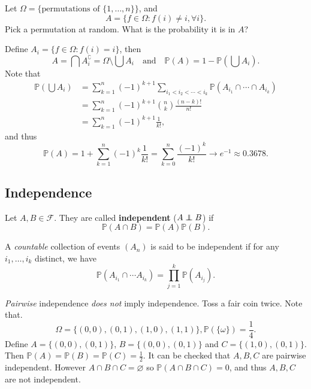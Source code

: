 \begin{example}
    Let $ \Omega=\{\text{permutations of }\{1,\dots,n\}\} $, and
    \[
        A = \{f\in\Omega: f(i)\neq i, \forall i\}.
    \]
    Pick a permutation at random. What is the probability it is in $A$?

    Define $ A_i = \{f\in \Omega: f(i)=i\} $, then 
    \[
        A=\bigcap A_i^{\complement} = \Omega\setminus \bigcup A_i \quad \text{and}\quad \mathbb{P}(A)=1-\mathbb{P}\left( \bigcup A_i \right).
    \]
    Note that 
    \begin{align*}
        \mathbb{P}\left( \bigcup A_i \right)&= \sum_{k=1}^{n}(-1)^{k+1} \sum_{i_1<i_2<\cdots<i_k}\mathbb{P}\left( A_{i_1}\cap \cdots \cap A_{i_k} \right)\\ 
        &= \sum_{k=1}^{n}(-1)^{k+1}\binom{n}{k}\frac{(n-k)!}{n!}\\ 
        &= \sum_{k=1}^{n}(-1)^{k+1}\frac{1}{k!},
    \end{align*}
    and thus 
    \[
        \mathbb{P}(A) = 1+\sum_{k=1}^{n}(-1)^{k}\frac{1}{k!} = \sum_{k=0}^{n}\frac{(-1)^k}{k!}\to e^{-1}\approx 0.3678.
    \]
\end{example}

\subsection{Independence}

\begin{definition}[Independence]
    Let $ A,B\in \mathcal{F} $. They are called \textbf{independent} ($ A \independent B $) if 
    \[
        \mathbb{P}(A \cap B) = \mathbb{P}(A)\mathbb{P}(B).
    \]

    A \textit{countable} collection of events $ (A_n) $ is said to be independent if for any $ i_1,\dots,i_k $ distinct, we have 
    \[
        \mathbb{P}(A_{i_1}\cap \cdots A_{i_k}) = \prod_{j=1}^{k}\mathbb{P}(A_{i_j}).
    \]
\end{definition}
\begin{remark}
    \textit{Pairwise} independence \textit{does not} imply independence. Toss a fair coin twice. Note that.
    \[
        \Omega=\{(0,0),(0,1),(1,0),(1,1)\}, \mathbb{P}(\{\omega\})=\frac{1}{4}.
    \]
    Define $ A=\{(0,0),(0,1)\} $, $ B=\{(0,0),(0,1)\} $ and $ C=\{(1,0),(0,1)\} $. Then $ \mathbb{P}(A)=\mathbb{P}(B)=\mathbb{P}(C)=\frac{1}{2} $. It can be checked that $A,B,C$ are pairwise independent. However $ A \cap B \cap C= \varnothing  $ so $ \mathbb{P}(A \cap B \cap C)=0 $, and thus $A,B,C$ are not independent.
\end{remark}

